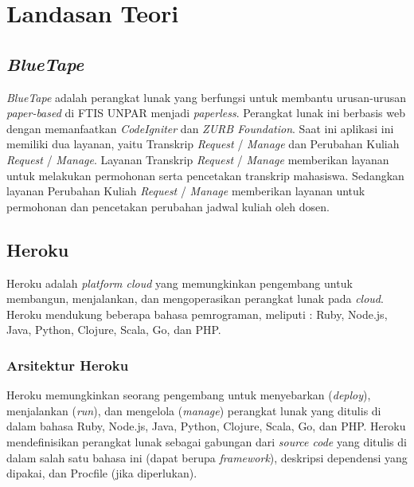 
\chapter{Landasan Teori}
\label{chap:teori}
\setcounter{secnumdepth}{3}



\section{\textit{BlueTape}}
\label{sec:BlueTape}
\textit{BlueTape} adalah perangkat lunak yang berfungsi untuk membantu urusan-urusan \textit{paper-based} di FTIS UNPAR menjadi \textit{paperless}. Perangkat lunak ini berbasis web dengan memanfaatkan \textit{CodeIgniter} dan \textit{ZURB Foundation}. Saat ini aplikasi ini memiliki dua layanan, yaitu Transkrip \textit{Request} / \textit{Manage} dan Perubahan Kuliah \textit{Request} / \textit{Manage}. Layanan Transkrip \textit{Request} / \textit{Manage} memberikan layanan untuk melakukan permohonan serta pencetakan transkrip mahasiswa. Sedangkan layanan Perubahan Kuliah \textit{Request} / \textit{Manage} memberikan layanan untuk permohonan dan pencetakan perubahan jadwal kuliah oleh dosen. \footnotemark
{}



\section{Heroku}
\label{sec:Heroku}
Heroku adalah \textit{platform cloud} yang memungkinkan pengembang untuk membangun, menjalankan, dan mengoperasikan perangkat lunak pada \textit{cloud}. Heroku mendukung beberapa bahasa pemrograman, meliputi : Ruby, Node.js, Java, Python, Clojure, Scala, Go, dan PHP. \footnotemark
{}


\subsection{Arsitektur Heroku}
Heroku memungkinkan seorang pengembang untuk menyebarkan (\textit{deploy}), menjalankan (\textit{run}), dan mengelola (\textit{manage}) perangkat lunak yang ditulis di dalam bahasa Ruby, Node.js, Java, Python, Clojure, Scala, Go, dan PHP. Heroku mendefinisikan perangkat lunak sebagai gabungan dari \textit{source code} yang ditulis di dalam salah satu bahasa ini (dapat berupa \textit{framework}), deskripsi dependensi yang dipakai, dan Procfile (jika diperlukan).


